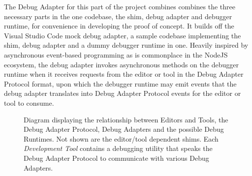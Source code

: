 \documentclass[12pt,pdftex,titlepage]{report}
\begin{document}
                The Debug Adapter for this part of the project combines combines the three necessary parts in the one codebase, the shim, debug adapter and debugger runtime, for convenience
                in developing the proof of concept. It builds off the Visual Studio Code mock debug adapter, a sample codebase implementing the shim, debug adapter and a dummy debugger
                runtime in one. Heavily inspired by asynchronous event-based programming as is commonplace in the NodeJS ecosystem, the debug adapter invokes asynchronous methods on the 
                debugger runtime when it receives requests from the editor or tool in the Debug Adapter Protocol format, upon which the debugger runtime may emit events that the debug adapter
                translates into Debug Adapter Protocol events for the editor or tool to consume.

                \begin{figure}[hbt!]
                    \centering
                    \caption{Diagram displaying the relationship between Editors and Tools, the Debug Adapter Protocol, Debug Adapters and the possible Debug Runtimes. Not shown are the
                        editor/tool dependent shims. Each \textit{Development Tool} contains a debugging utility that speaks the Debug Adapter Protocol to communicate with various Debug
                        Adapters.}
                    \label{fig:debug-arch}
                \end{figure}
\end{document}
